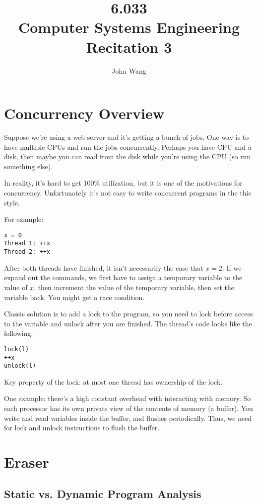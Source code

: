 \documentclass[psamsfonts]{amsart}
\title{6.033 \\
Computer Systems Engineering \\
Recitation 3}
\author{John Wang}
\begin{document}
\maketitle

\section{Concurrency Overview}

Suppose we're using a web server and it's getting a bunch of jobs. One way is to have multiple CPUs and run the jobs concurrently. Perhaps you have CPU and a disk, then maybe you can read from the disk while you're using the CPU (so run something else).

In reality, it's hard to get 100\% utilization, but it is one of the motivations for concurrency. Unfortunately it's not easy to write concurrent programs in the this style.

For example:
\begin{verbatim}
x = 0
Thread 1: ++x
Thread 2: ++x
\end{verbatim}

After both threads have finished, it isn't necessarily the case that $x = 2$. If we expand out the commands, we first have to assign a temporary variable to the value of $x$, then increment the value of the temporary variable, then set the variable back. You might get a race condition.

Classic solution is to add a lock to the program, so you need to lock before access to the variable and unlock after you are finished. The thread's code looks like the following:
\begin{verbatim}
lock(l)
++x
unlock(l)
\end{verbatim}

Key property of the lock: at most one thread has ownership of the lock.

One example: there's a high constant overhead with interacting with memory. So each processor has its own private view of the contents of memory (a buffer). You write and read variables inside the buffer, and flushes periodically. Thus, we need for lock and unlock instructions to flush the buffer.

\section{Eraser}

\subsection{Static vs. Dynamic Program Analysis}
\end{document}

